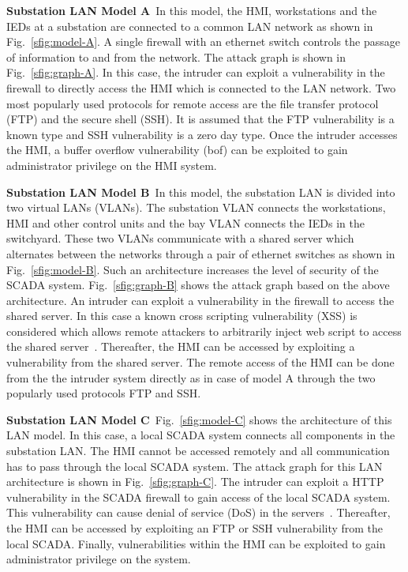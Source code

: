\noindent\textbf{Substation LAN Model A}\ 
In this model, the HMI, workstations and the IEDs at a substation are connected to a common LAN network as shown in Fig.~\ref{sfig:model-A}. A single firewall with an ethernet switch controls the passage of information to and from the network. The attack graph is shown in Fig.~\ref{sfig:graph-A}. In this case, the intruder can exploit a vulnerability in the firewall to directly access the HMI which is connected to the LAN network. Two most popularly used protocols for remote access are the file transfer protocol (FTP) and the secure shell (SSH). It is assumed that the FTP vulnerability is a known type and SSH vulnerability is a zero day type. Once the intruder accesses the HMI, a buffer overflow vulnerability (bof) can be exploited to gain administrator privilege on the HMI system.

\noindent\textbf{Substation LAN Model B}\ 
In this model, the substation LAN is divided into two virtual LANs (VLANs). The substation VLAN connects the workstations, HMI and other control units and the bay VLAN connects the IEDs in the switchyard. These two VLANs communicate with a shared server which alternates between the networks through a pair of ethernet switches as shown in Fig.~\ref{sfig:model-B}. Such an architecture increases the level of security of the SCADA system. Fig.~\ref{sfig:graph-B} shows the attack graph based on the above architecture. An intruder can exploit a vulnerability in the firewall to access the shared server. In this case a known cross scripting vulnerability (XSS) is considered which allows remote attackers to arbitrarily inject web script to access the shared server~\cite{ftp}. Thereafter, the HMI can be accessed by exploiting a vulnerability from the shared server. The remote access of the HMI can be done from the the intruder system directly  as in case of model A through the two popularly used protocols FTP and SSH.

\noindent\textbf{Substation LAN Model C}\ 
Fig.~\ref{sfig:model-C} shows the architecture of this LAN model. In this case, a local SCADA system connects all components in the substation LAN. The HMI cannot be accessed remotely and all communication has to pass through the local SCADA system. The attack graph for this LAN architecture is shown in Fig.~\ref{sfig:graph-C}. The intruder can exploit a HTTP vulnerability in the SCADA firewall to gain access of the local SCADA system. This vulnerability can cause denial of service (DoS) in the servers~\cite{http}. Thereafter, the HMI can be accessed by exploiting an FTP or SSH vulnerability from the local SCADA. Finally, vulnerabilities within the HMI can be exploited to gain administrator privilege on the system.

